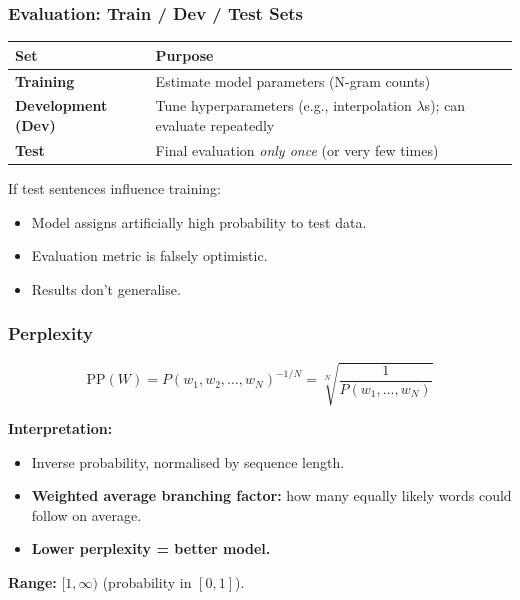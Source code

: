 \bigseparator

\subsubsection{Evaluation: Train / Dev / Test Sets}

\begin{defbox}
\begin{center}
\renewcommand{\arraystretch}{1.3}
\begin{tabular}{@{} l p{9cm} @{}}
\toprule
\textbf{Set} & \textbf{Purpose} \\
\midrule
\textbf{Training} & Estimate model parameters (N-gram counts) \\
\textbf{Development (Dev)} & Tune hyperparameters (e.g., interpolation $\lambda$s); can evaluate repeatedly \\
\textbf{Test} & Final evaluation \textit{only once} (or very few times) \\
\bottomrule
\end{tabular}
\end{center}
\end{defbox}

\begin{tipbox}[Training on the Test Set = Bad Science!]
If test sentences influence training:
\begin{itemize}
  \item Model assigns artificially high probability to test data.
  \item Evaluation metric is falsely optimistic.
  \item Results don't generalise.
\end{itemize}
\end{tipbox}

\separator

\subsubsection{Perplexity}

\begin{defbox}[Perplexity (PP)]
\[
\text{PP}(W) = P(w_1, w_2, \ldots, w_N)^{-1/N} = \sqrt[N]{\frac{1}{P(w_1, \ldots, w_N)}}
\]

\textbf{Interpretation:}
\begin{itemize}
  \item Inverse probability, normalised by sequence length.
  \item \textbf{Weighted average branching factor:} how many equally likely words could follow on average.
  \item \textbf{Lower perplexity = better model.}
\end{itemize}

\textbf{Range:} $[1, \infty)$ (probability in $[0, 1]$).
\end{defbox}

